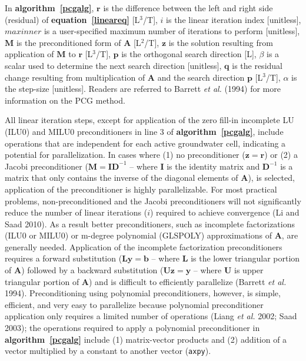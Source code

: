 \documentclass[12pt]{article}
\begin{document}
In \textbf{algorithm~\ref{pcgalg}}, $\mathbf{r}$ is the \color{cyan}difference between the left and right side (residual) \color{black}of \textbf{equation~\ref{lineareq}} [L$^3$/T], $i$ is the linear iteration index [unitless], $maxinner$ is a user-specified maximum number of iterations to perform [unitless], $\mathbf{M}$ is the preconditioned form of $\mathbf{A}$ [L$^2$/T], $\mathbf{z}$ is the solution resulting from application of $\mathbf{M}$ to $\mathbf{r}$ [L$^3$/T], $\mathbf{p}$ is the orthogonal search direction [L], $\beta$ is a scalar used to determine the next search direction [unitless], $\mathbf{q}$ is the residual change resulting from multiplication of $\mathbf{A}$ and the search direction $\mathbf{p}$ [L$^3$/T], $\alpha$ is the step-size [unitless]. \color{cyan}Readers are referred to Barrett \textit{et al.} (1994) for more information on the PCG method.\color{black}

All linear iteration steps, except for application of the zero fill-in incomplete LU (ILU0) and MILU0 preconditioners in line 3 of \textbf{algorithm~\ref{pcgalg}}, include operations that are independent for each active groundwater cell, indicating a potential for parallelization. In cases where (1) no preconditioner ($\mathbf{z = r}$) or (2) a Jacobi preconditioner ($\mathbf{M = I D}^{-1}$ -- where $\mathbf{I}$ is the identity matrix and $\mathbf{D}^{-1}$ is a matrix that only contains the inverse of the diagonal elements of $\mathbf{A}$), is selected, application of the preconditioner is highly parallelizable. For most practical problems, non-preconditioned and the Jacobi preconditioners will not significantly reduce the number of linear iterations ($i$) required to achieve convergence (Li and Saad 2010). As a result better preconditioners, such as incomplete factorizations (ILU0 or MILU0) or m-degree polynomial (GLSPOLY) approximations of $\mathbf{A}$, are generally needed. Application of the incomplete factorization preconditioners requires a forward substitution ($\mathbf{Ly = b}$ -- where $\mathbf{L}$ is the lower triangular portion of $\mathbf{A}$) followed by a backward substitution ($\mathbf{Uz = y}$ – where $\mathbf{U}$ is upper triangular portion of $\mathbf{A}$) and is difficult to efficiently parallelize (Barrett \textit{et al.} 1994). Preconditioning using polynomial preconditioners, however, is simple, efficient, and very easy to parallelize \color{cyan}because polynomial preconditioner application only requires a limited number of operations (Liang \textit{et al.} 2002; Saad 2003); the operations required to apply a polynomial preconditioner in \textbf{algorithm~\ref{pcgalg}} include (1) matrix-vector products and (2) addition of a vector multiplied by a constant to another vector (\texttt{axpy}).\color{black}
\end{document}
